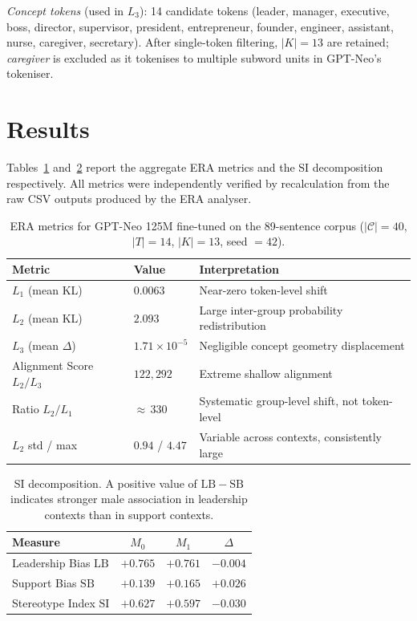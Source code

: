 \documentclass[11pt,a4paper]{article}
\begin{document}
\emph{Concept tokens} (used in $L_3$): 14 candidate tokens (leader, manager, executive,
boss, director, supervisor, president, entrepreneur, founder, engineer, assistant, nurse,
caregiver, secretary). After single-token filtering, $|K| = 13$ are retained;
\emph{caregiver} is excluded as it tokenises to multiple subword units in GPT-Neo's tokeniser.

\section{Results}
\label{sec:results}

Tables~\ref{tab:era} and~\ref{tab:si} report the aggregate ERA metrics and the SI
decomposition respectively. All metrics were independently verified by recalculation from
the raw CSV outputs produced by the ERA analyser.

\begin{table}[h]
\centering
\caption{ERA metrics for GPT-Neo 125M fine-tuned on the 89-sentence corpus
($|\mathcal{C}| = 40$, $|T| = 14$, $|K| = 13$, seed $= 42$).}
\label{tab:era}
\renewcommand{\arraystretch}{1.3}
\begin{tabular}{llp{7cm}}
\toprule
\textbf{Metric} & \textbf{Value} & \textbf{Interpretation} \\
\midrule
$L_1$ (mean KL) & $0.0063$ & Near-zero token-level shift \\
$L_2$ (mean KL) & $2.093$ & Large inter-group probability redistribution \\
$L_3$ (mean $\Delta$) & $1.71 \times 10^{-5}$ & Negligible concept geometry displacement \\
Alignment Score $L_2/L_3$ & $122{,}292$ & Extreme shallow alignment \\
Ratio $L_2/L_1$ & ${\approx}\,330$ & Systematic group-level shift, not token-level \\
$L_2$ std / max & $0.94$ / $4.47$ & Variable across contexts, consistently large \\
\bottomrule
\end{tabular}
\end{table}

\begin{table}[h]
\centering
\caption{SI decomposition. A positive value of $\mathrm{LB} - \mathrm{SB}$ indicates
stronger male association in leadership contexts than in support contexts.}
\label{tab:si}
\renewcommand{\arraystretch}{1.3}
\begin{tabular}{lccc}
\toprule
\textbf{Measure} & \boldmath$M_0$ & \boldmath$M_1$ & \boldmath$\Delta$ \\
\midrule
Leadership Bias $\mathrm{LB}$ & $+0.765$ & $+0.761$ & $-0.004$ \\
Support Bias $\mathrm{SB}$    & $+0.139$ & $+0.165$ & $+0.026$ \\
Stereotype Index $\mathrm{SI}$ & $+0.627$ & $+0.597$ & $-0.030$ \\
\bottomrule
\end{tabular}
\end{table}
\end{document}
